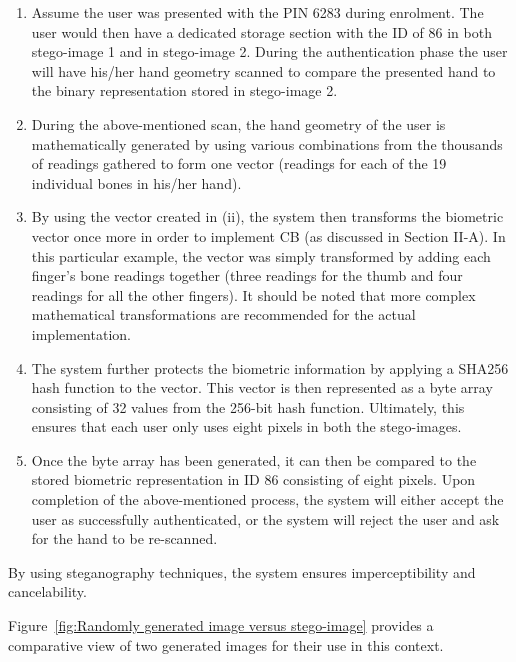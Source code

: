 \begin{enumerate}[label=\roman*.]
    
    \item  Assume the user was presented with the PIN 6283 during enrolment. The user would then have a dedicated storage section with the ID of 86 in both stego-image 1 and in stego-image 2. During the authentication phase the user will have his/her hand geometry scanned to compare the presented hand to the binary representation stored in stego-image 2. 
    
    \item  During the above-mentioned scan, the hand geometry of the user is mathematically generated by using various combinations from the thousands of readings gathered to form one vector (readings for each of the 19 individual bones in his/her hand).
    
    \item By using the vector created in (ii), the system then transforms the biometric vector once more in order to implement CB (as discussed in Section II-A). In this particular example, the vector was simply transformed by adding each finger’s bone readings together (three readings for the thumb and four readings for all the other fingers). It should be noted that more complex mathematical transformations are recommended for the actual implementation.
    
    \item The system further protects the biometric information by applying a SHA256 hash function to the vector. This vector is then represented as a byte array consisting of 32 values from the 256-bit hash function. Ultimately, this ensures that each user only uses eight pixels in both the stego-images.
    
    \item Once the byte array has been generated, it can then be compared to the stored biometric representation in ID 86 consisting of eight pixels.
Upon completion of the above-mentioned process, the system will either accept the user as successfully authenticated, or the system will reject the user and ask for the hand to be re-scanned.

\end{enumerate}

By using steganography techniques, the system ensures imperceptibility and cancelability.

Figure~\ref{fig:Randomly generated image versus stego-image} provides a comparative view of two generated images for their use in this context. 

